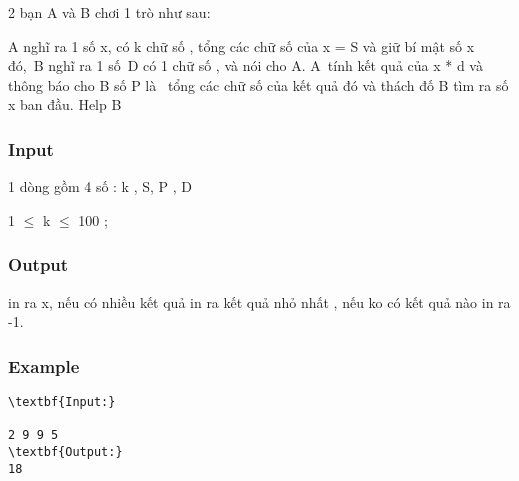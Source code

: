 



   2 bạn A và B chơi 1 trò như sau:  

   A nghĩ ra 1 số x, có k chữ số , tổng các chữ số của x = S và giữ bí mật số x đó, B nghĩ ra 1 số D có 1 chữ số , và nói cho A. A tính kết quả của x * d và thông báo cho B số P là  tổng các chữ số của kết quả đó và thách đố B tìm ra số x ban đầu. Help B  

\subsubsection{   Input  }

   1 dòng gồm 4 số : k , S, P , D  

   1 $\le$ k  $\le$  100 ;  

\subsubsection{   Output  }

   in ra x, nếu có nhiều kết quả in ra kết quả nhỏ nhất , nếu ko có kết quả nào in ra -1.  

\subsubsection{   Example  }
\begin{verbatim}
\textbf{Input:}

2 9 9 5
\textbf{Output:}
18
\end{verbatim}
